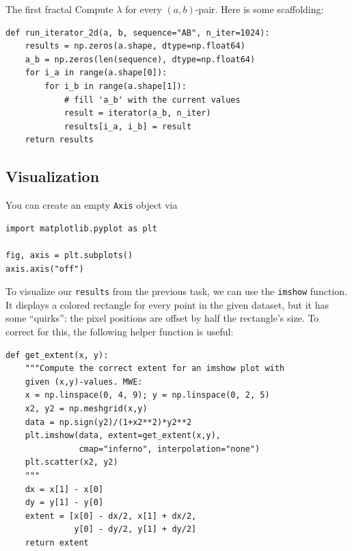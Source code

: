 \documentclass[english,landscape]{article}
\begin{document}
\begin{minipage}[c]{0.4\pagewidth}
\begin{taskbox}{The first fractal}
Compute $\lambda$ for every $(a,b)$-pair.
Here is some scaffolding:
\begin{verbatim}
def run_iterator_2d(a, b, sequence="AB", n_iter=1024):
    results = np.zeros(a.shape, dtype=np.float64)
    a_b = np.zeros(len(sequence), dtype=np.float64)
    for i_a in range(a.shape[0]):
        for i_b in range(a.shape[1]):
            # fill 'a_b' with the current values
            result = iterator(a_b, n_iter)
            results[i_a, i_b] = result
    return results
\end{verbatim}
\end{taskbox}
\subsection{Visualization}
You can create an empty \texttt{Axis} object via
\begin{verbatim}
import matplotlib.pyplot as plt

fig, axis = plt.subplots()
axis.axis("off")
\end{verbatim}
To visualize our \texttt{results} from the previous task, we can use the \texttt{imshow} function.
It displays a colored rectangle for every point in the given dataset, but it has some \enquote{quirks}: the pixel positions are offset by half the rectangle's size.
To correct for this, the following helper function is useful:
\begin{verbatim}
def get_extent(x, y):
    """Compute the correct extent for an imshow plot with 
    given (x,y)-values. MWE:
    x = np.linspace(0, 4, 9); y = np.linspace(0, 2, 5)
    x2, y2 = np.meshgrid(x,y)
    data = np.sign(y2)/(1+x2**2)*y2**2
    plt.imshow(data, extent=get_extent(x,y),
               cmap="inferno", interpolation="none")
    plt.scatter(x2, y2)
    """
    dx = x[1] - x[0]
    dy = y[1] - y[0]
    extent = [x[0] - dx/2, x[1] + dx/2,
              y[0] - dy/2, y[1] + dy/2]
    return extent
\end{verbatim}
\end{minipage}%
\begin{minipage}[c]{0.1\pagewidth}
\,
\end{minipage}%
\end{document}
